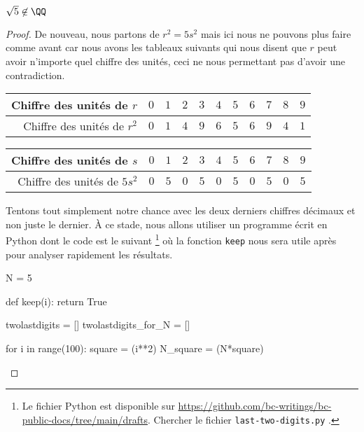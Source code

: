 \begin{fact} \label{sqrt-5-not-in-Q}
	$\sqrt5 \not\in \QQ$
\end{fact}

\begin{proof}
	De nouveau, nous partons de $r^2 = 5s^2$ mais ici nous ne pouvons plus faire comme avant car nous avons les tableaux suivants qui nous disent que $r$ peut avoir n'importe quel chiffre des unités, ceci ne nous permettant pas d'avoir une contradiction.

	\begin{center}
		\begin{tabular}{|r|c|c|c|c|c|c|c|c|c|c|}
			\hline
			Chiffre des unités de $r$
			  & $0$  &  $1$  &  $2$  &  $3$  &  $4$  &  $5$  &  $6$  &  $7$  &  $8$  &  $9$
			\\ \hline
			\phantom{$5$}Chiffre des unités de $r^2$
			  & $0$  &  $1$  &  $4$  &  $9$  &  $6$  &  $5$  &  $6$  &  $9$  &  $4$  &  $1$
			\\ \hline
		\end{tabular}

		\medskip

		\begin{tabular}{|r|c|c|c|c|c|c|c|c|c|c|}
			\hline
			Chiffre des unités de $s$
			  & $0$  &  $1$  &  $2$  &  $3$  &  $4$  &  $5$  &  $6$  &  $7$  &  $8$  &  $9$
			\\ \hline
			Chiffre des unités de $5s^2$
			  & $0$  &  $5$  &  $0$  &  $5$  &  $0$  &  $5$  &  $0$  &  $5$  &  $0$  &  $5$
			\\ \hline
		\end{tabular}
	\end{center}

    \medskip

    Tentons tout simplement notre chance avec les deux derniers chiffres décimaux et non juste le dernier.
    À ce stade, nous allons utiliser un programme écrit en Python dont le code est le suivant
    \footnote{
    	Le fichier Python est disponible sur \url{https://github.com/bc-writings/bc-public-docs/tree/main/drafts}.
		Chercher le fichier \texttt{last-two-digits.py} .
	}
	où la fonction \verb+keep+ nous sera utile après pour analyser rapidement les résultats.

	\begin{rawcode}
N = 5

def keep(i):
    return True

twolastdigits       = []
twolastdigits_for_N = []

for i in range(100):
    square   = (i**2)%
    N_square = (N*square)%


\end{rawcode}
\end{proof}
